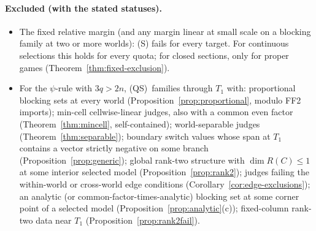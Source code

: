 \documentclass[11pt]{article}
\theoremstyle{definition}
\theoremstyle{remark}
\newcommand{\src}[1]{\textsf{#1}}
\newcommand{\QS}{\textup{(QS)}}
\begin{document}
\paragraph{Excluded (with the stated statuses).}
\begin{itemize}[leftmargin=*]
\item The fixed relative margin (and any margin linear at small scale on a blocking family at two or more worlds): (S) fails for every target. For continuous selections this holds for every quota; for closed sections, only for proper games (Theorem~\ref{thm:fixed-exclusion}).
\item For the $\psi$-rule with $3q>2n$, \QS\ families through $T_1$ with:
 proportional blocking sets at every world (Proposition~\ref{prop:proportional}, modulo \src{FF2} imports);
 min-cell cellwise-linear judges, also with a common even factor (Theorem~\ref{thm:mincell}, self-contained);
 world-separable judges (Theorem~\ref{thm:separable});
 boundary switch values whose span at $T_1$ contains a vector strictly negative on some branch (Proposition~\ref{prop:generic});
 global rank-two structure with $\dim R(C)\le1$ at some interior selected model (Proposition~\ref{prop:rank2});
 judges failing the within-world or cross-world edge conditions (Corollary~\ref{cor:edge-exclusions});
 an analytic (or common-factor-times-analytic) blocking set at some corner point of a selected model (Proposition~\ref{prop:analytic}(c));
 fixed-column rank-two data near $T_1$ (Proposition~\ref{prop:rank2fail}).
\end{itemize}
\end{document}
